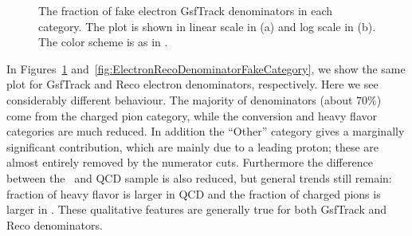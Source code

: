 \documentclass{cmspaper}
\begin{document}
\begin{figure}[htb]
\begin{center}
   \caption{The fraction of fake electron GsfTrack denominators in each category. The plot is shown in linear scale in (a) and log scale in (b). The color scheme is as in .}
   \label{fig:ElectronGsfTrackDenominatorFakeCategory}
\end{center}
\end{figure}

In Figures~\ref{fig:ElectronGsfTrackDenominatorFakeCategory} and~\ref{fig:ElectronRecoDenominatorFakeCategory}, we show the same plot for GsfTrack and Reco electron denominators, respectively. Here we see considerably different behaviour. The majority of denominators (about $70\%$) come from the charged pion category, while the conversion and heavy flavor categories are much reduced. In addition the ``Other'' category gives a marginally significant contribution, which are mainly due to a leading proton; these are almost entirely removed by the numerator cuts. Furthermore the difference between the \WPlusJets\ and QCD sample is also reduced, but general trends still remain: fraction of heavy flavor is larger in QCD and the fraction of charged pions is larger in \WPlusJets. These qualitative features are generally true for both GsfTrack and Reco denominators. 
\end{document}
